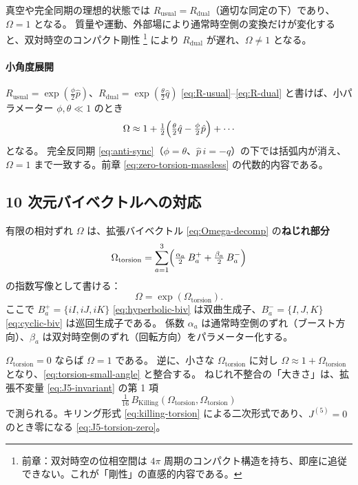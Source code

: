 \documentclass[dvipdfmx,a4paper,oneside]{jsbook}
\numberwithin{equation}{chapter}
\begin{document}
真空や完全同期の理想的状態では \(R_{\mathrm{usual}} = R_{\mathrm{dual}}\)（適切な同定の下）であり、\(\Omega = 1\) となる。
質量や運動、外部場により通常時空側の変換だけが変化すると、双対時空のコンパクト剛性 \footnote{前章：双対時空の位相空間は \(4\pi\) 周期のコンパクト構造を持ち、即座に追従できない。これが「剛性」の直感的内容である。} により \(R_{\mathrm{dual}}\) が遅れ、\(\Omega \neq 1\) となる。

\paragraph{小角度展開}
\(R_{\mathrm{usual}} = \exp(\tfrac{\phi}{2}\hat{p})\)、\(R_{\mathrm{dual}} = \exp(\tfrac{\theta}{2}\hat{q})\) \eqref{eq:R-usual}–\eqref{eq:R-dual} と書けば、小パラメーター \(\phi, \theta \ll 1\) のとき
\begin{equation}
  \Omega
  \approx 1 + \tfrac{1}{2}\Bigl(\tfrac{\theta}{2}\hat{q} - \tfrac{\phi}{2}\hat{p}\Bigr)
  + \cdots
  \label{eq:torsion-small-angle}
\end{equation}
となる。
完全反同期 \eqref{eq:anti-sync}（\(\phi = \theta\)、\(\hat{p}\, i = -\hat{q}\)）の下では括弧内が消え、\(\Omega = 1\) まで一致する。前章 \eqref{eq:zero-torsion-massless} の代数的内容である。

\subsection{10 次元バイベクトルへの対応}

有限の相対ずれ \(\Omega\) は、拡張バイベクトル \eqref{eq:Omega-decomp} の\textbf{ねじれ部分}
\begin{equation}
  \Omega_{\mathrm{torsion}}
  = \sum_{a=1}^{3} \Bigl( \tfrac{\alpha_a}{2}\, B_a^{+} + \tfrac{\beta_a}{2}\, B_a^{-} \Bigr)
  \label{eq:Omega-torsion-only}
\end{equation}
の指数写像として書ける：
\begin{equation}
  \Omega = \exp(\Omega_{\mathrm{torsion}}).
  \label{eq:torsion-exp}
\end{equation}
ここで \(B_a^{+} = \{iI, iJ, iK\}\) \eqref{eq:hyperbolic-biv} は双曲生成子、\(B_a^{-} = \{I, J, K\}\) \eqref{eq:cyclic-biv} は巡回生成子である。
係数 \(\alpha_a\) は通常時空側のずれ（ブースト方向）、\(\beta_a\) は双対時空側のずれ（回転方向）をパラメーター化する。

\(\Omega_{\mathrm{torsion}} = 0\) ならば \(\Omega = 1\) である。
逆に、小さな \(\Omega_{\mathrm{torsion}}\) に対し \(\Omega \approx 1 + \Omega_{\mathrm{torsion}}\) となり、\eqref{eq:torsion-small-angle} と整合する。
ねじれ不整合の「大きさ」は、拡張不変量 \eqref{eq:J5-invariant} の第 1 項
\begin{equation}
  \tfrac{1}{16}\, B_{\mathrm{Killing}}(\Omega_{\mathrm{torsion}}, \Omega_{\mathrm{torsion}})
  \label{eq:J5-torsion-term}
\end{equation}
で測られる。キリング形式 \eqref{eq:killing-torsion} による二次形式であり、\(J^{(5)} = 0\) のとき零になる \eqref{eq:J5-torsion-zero}。
\end{document}
